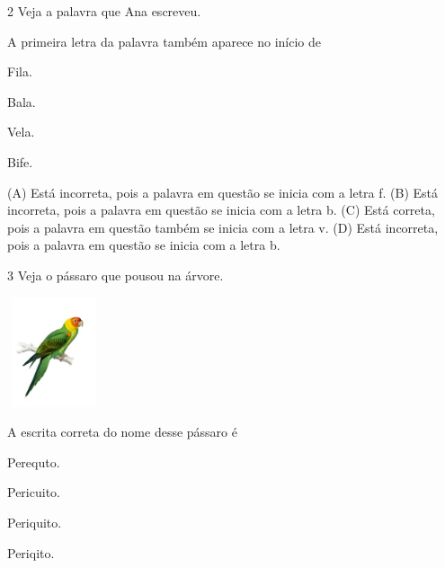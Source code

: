 \num{2} Veja a palavra que Ana escreveu.


A primeira letra da palavra também aparece no início de 

\begin{minipage}{.5\textwidth}
\begin{escolha}
\item Fila.

\item Bala.

\item Vela.

\item Bife.
\end{escolha}
\end{minipage}

(A) Está incorreta, pois a palavra em questão se inicia com a letra f.
(B) Está incorreta, pois a palavra em questão se inicia com a letra b.
(C) Está correta, pois a palavra em questão também se inicia com a letra v.
(D) Está incorreta, pois a palavra em questão se inicia com a letra b.

\num{3} Veja o pássaro que pousou na árvore.

\includegraphics[width=1.08542in,height=1.27222in]{media/image165.jpeg}


A escrita correta do nome desse pássaro é

\begin{minipage}{.5\textwidth}
\begin{escolha}
\item Perequto.

\item Pericuito.

\item Periquito.

\item Periqito.
\end{escolha}
\end{minipage}

